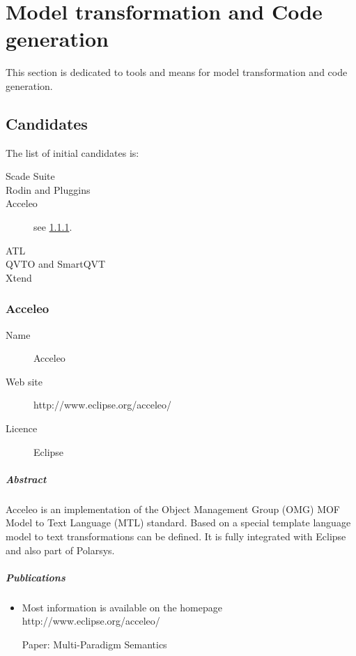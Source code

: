 

\chapter{Model transformation and Code generation}
\label{sec:transfo}

This section is dedicated to tools and means for model transformation and code generation.



\section{Candidates}


The list of initial candidates is:

\begin{description}
\item [Scade Suite]
\item [Rodin and Pluggins]
\item [Acceleo] see \ref{sec:Acceleo}.
\item [ATL]
\item [QVTO and SmartQVT]
\item [Xtend]
\end{description}



\subsection{Acceleo}
\label{sec:Acceleo}

\begin{description}
\item[Name] Acceleo
\item[Web site] http://www.eclipse.org/acceleo/
\item[Licence] Eclipse
\end{description}

\paragraph{Abstract} %
Acceleo is an implementation of the Object Management Group (OMG) MOF Model to Text Language (MTL) standard. Based on a special template language model to text transformations can be defined. It is fully integrated with Eclipse and also part of Polarsys.

\paragraph{Publications} %
\begin{itemize}
\item Most information is available on the homepage http://www.eclipse.org/acceleo/
\item [Paper: Multi-Paradigm Semantics]
\end{itemize}

